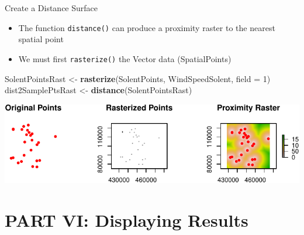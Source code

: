 \documentclass[10pt,ignorenonframetext,]{beamer}
\newenvironment{Shaded}{\begin{snugshade}}{\end{snugshade}}
\newcommand{\KeywordTok}[1]{\textcolor[rgb]{0.13,0.29,0.53}{\textbf{{#1}}}}
\newcommand{\DataTypeTok}[1]{\textcolor[rgb]{0.13,0.29,0.53}{{#1}}}
\newcommand{\DecValTok}[1]{\textcolor[rgb]{0.00,0.00,0.81}{{#1}}}
\newcommand{\StringTok}[1]{\textcolor[rgb]{0.31,0.60,0.02}{{#1}}}
\newcommand{\NormalTok}[1]{{#1}}
\providecommand{\tightlist}{%
  \setlength{\itemsep}{0pt}\setlength{\parskip}{0pt}}
\begin{document}
\begin{frame}[fragile]{Create a Distance Surface}

\begin{itemize}
\tightlist
\item
  The function \texttt{distance()} can produce a proximity raster to the
  nearest spatial point
\item
  We must first \texttt{rasterize()} the Vector data (SpatialPoints)
\end{itemize}

\begin{Shaded}
\begin{Highlighting}[]
\NormalTok{SolentPointsRast <-}\StringTok{ }\KeywordTok{rasterize}\NormalTok{(SolentPoints, WindSpeedSolent, }
    \DataTypeTok{field =} \DecValTok{1}\NormalTok{)}
\NormalTok{dist2SamplePtsRast <-}\StringTok{ }\KeywordTok{distance}\NormalTok{(SolentPointsRast)}
\end{Highlighting}
\end{Shaded}

\begin{center}\includegraphics[width=1\linewidth]{SpatialDataLecture_files/figure-beamer/unnamed-chunk-37-1} \end{center}

\end{frame}

\section{PART VI: Displaying Results}\label{part-vi-displaying-results}
\end{document}
